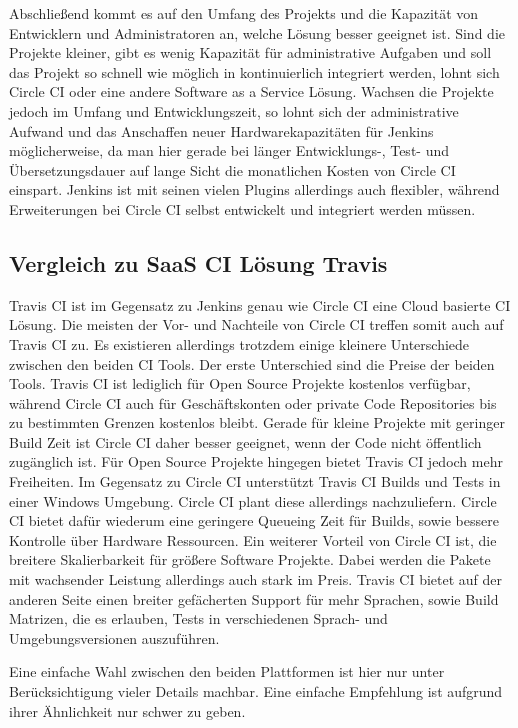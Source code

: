 \documentclass[11pt]{article}
\begin{document}
Abschließend kommt es auf den Umfang des Projekts und die Kapazität von Entwicklern und Administratoren
an, welche Lösung besser geeignet ist. Sind die Projekte kleiner, gibt es wenig Kapazität für
administrative Aufgaben und soll das Projekt so schnell wie möglich in kontinuierlich integriert
werden, lohnt sich Circle CI oder eine andere Software as a Service Lösung. Wachsen die Projekte
jedoch im Umfang und Entwicklungszeit, so lohnt sich der administrative Aufwand und das Anschaffen
neuer Hardwarekapazitäten für Jenkins möglicherweise, da man hier gerade bei länger Entwicklungs-,
Test- und Übersetzungsdauer auf lange Sicht die monatlichen Kosten von Circle CI einspart.
Jenkins ist mit seinen vielen Plugins allerdings auch flexibler, während Erweiterungen bei Circle CI
selbst entwickelt und integriert werden müssen.

\subsection {Vergleich zu SaaS CI Lösung Travis}
Travis CI ist im Gegensatz zu Jenkins genau wie Circle CI eine Cloud basierte CI Lösung. Die meisten
der Vor- und Nachteile von Circle CI treffen somit auch auf Travis CI zu. Es existieren allerdings
trotzdem einige kleinere Unterschiede zwischen den beiden CI Tools. Der erste Unterschied sind die
Preise der beiden Tools. Travis CI ist lediglich für Open Source Projekte kostenlos verfügbar, während
Circle CI auch für Geschäftskonten oder private Code Repositories bis zu bestimmten Grenzen kostenlos
bleibt. Gerade für kleine Projekte mit geringer Build Zeit ist Circle CI daher besser geeignet, wenn der
Code nicht öffentlich zugänglich ist. Für Open Source Projekte hingegen bietet Travis CI jedoch mehr
Freiheiten. Im Gegensatz zu Circle CI unterstützt Travis CI Builds und Tests in einer Windows Umgebung.
Circle CI plant diese allerdings nachzuliefern. Circle CI bietet dafür wiederum eine geringere Queueing
Zeit für Builds, sowie bessere Kontrolle über Hardware Ressourcen. Ein weiterer Vorteil von Circle CI
ist, die breitere Skalierbarkeit für größere Software Projekte. Dabei werden die Pakete mit wachsender
Leistung allerdings auch stark im Preis. Travis CI bietet auf der anderen Seite einen breiter gefächerten
Support für mehr Sprachen, sowie Build Matrizen, die es erlauben, Tests in verschiedenen Sprach- und
Umgebungsversionen auszuführen.

Eine einfache Wahl zwischen den beiden Plattformen ist hier nur unter Berücksichtigung vieler Details
machbar. Eine einfache Empfehlung ist aufgrund ihrer Ähnlichkeit nur schwer zu geben.
\end{document}
